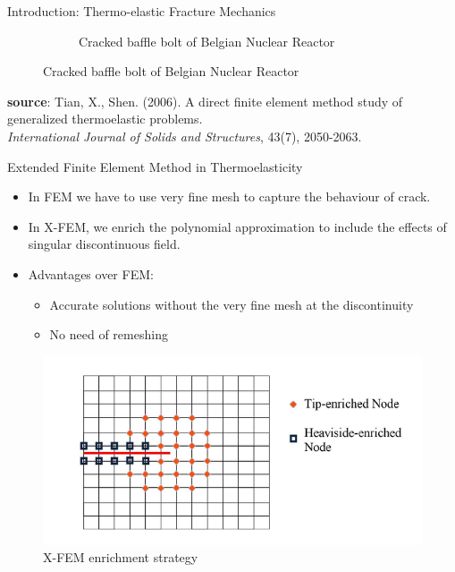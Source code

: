 \documentclass{beamer}
\begin{document}
\begin{frame}[t,fragile]{Introduction: Thermo-elastic Fracture Mechanics}
\begin{itemize}
\begin{figure}[H]
\begin{subfigure}{0.45\textwidth}
 \caption{\tiny{Cracked baffle bolt of Belgian Nuclear Reactor}}
 \end{subfigure}
 \end{figure}
 \end{itemize}
 \vspace{.1cm}
   \tiny
   \hspace{15pt}
   \textbf{source}: Tian, X., Shen. (2006). A direct finite element method study of generalized thermoelastic problems. \\
   \vspace{-7pt}
   \hspace{15pt}
   \emph{International Journal of Solids and Structures}, 43(7), 2050-2063.
\end{frame}
\begin{frame}[t,fragile]{Extended Finite Element Method in Thermoelasticity}
    \vspace{-.3cm}
    \small
    \begin{itemize}
        \item In FEM we have to use very fine mesh to capture the behaviour of crack.
\item In X-FEM, we enrich the polynomial approximation to include the effects of singular discontinuous field.
    \item Advantages over FEM:
    \begin{itemize}
        \item Accurate solutions without the very fine mesh at the discontinuity
        \item No need of remeshing 
    \end{itemize}
\end{itemize}
\begin{figure}
     \centering
     \vspace{-10pt}
     \includegraphics[scale=.3]{enrich.png}
     \vspace{-.4cm}
     \caption{\hspace{-2cm}\footnotesize X-FEM enrichment strategy}
  \end{figure}
\end{frame}
\end{document}
